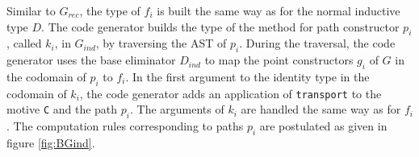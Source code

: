 \documentclass[runningheads]{llncs}
\begin{document}
Similar to $G_{rec}$, the type of $f_i$ is built the same way as for the normal inductive type $D$.
The code generator builds the type of the method for path constructor $p_i$, called $k_i$, in $G_{ind}$, by traversing the AST of $p_i$. During the traversal, the code generator uses the base eliminator $D_{ind}$ to map the point constructors $g_i$ of $G$ in the codomain of $p_i$ to $f_i$. In the first argument to the identity type in the codomain of $k_i$, the code generator adds an application of  {\tt transport} to the motive {\tt C} and the path $p_i$. The arguments of $k_i$ are handled the same way as for $f_i$.
The computation rules corresponding to paths $p_i$ are postulated as given in figure \ref{fig:BGind}.
\end{document}
